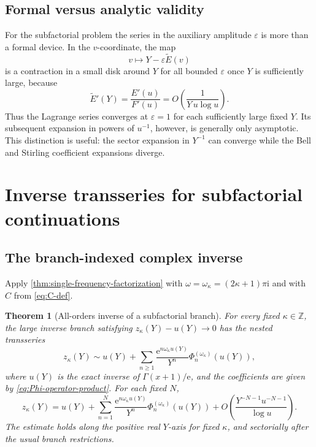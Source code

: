 \documentclass[11pt]{article}
\numberwithin{equation}{section}
\theoremstyle{mainthm}
\newtheorem{theorem}{Theorem}[section]
\theoremstyle{defstyle}
\theoremstyle{remark}
\newcommand{\e}{\mathrm e}
\newcommand{\ii}{\mathrm i}
\begin{document}
\subsection{Formal versus analytic validity}

For the subfactorial problem the series in the auxiliary amplitude \(\varepsilon\) is more than a formal device.  In the \(v\)-coordinate, the map
\[
 v\longmapsto Y-\varepsilon\widetilde E(v)
\]
is a contraction in a small disk around \(Y\) for all bounded \(\varepsilon\) once \(Y\) is sufficiently large, because
\begin{equation}\label{eq:Etilde-derivative}
 \widetilde E'(Y)=\frac{E'(u)}{F'(u)}
 =O\!\left(\frac{1}{Y\,u\log u}\right).
\end{equation}
Thus the Lagrange series converges at \(\varepsilon=1\) for each sufficiently large fixed \(Y\).  Its subsequent expansion in powers of \(u^{-1}\), however, is generally only asymptotic.  This distinction is useful: the sector expansion in \(Y^{-1}\) can converge while the Bell and Stirling coefficient expansions diverge.

\section{Inverse transseries for subfactorial continuations}\label{sec:subfactorial-main}

\subsection{The branch-indexed complex inverse}

Apply \cref{thm:single-frequency-factorization} with \(\omega=\omega_\kappa=(2\kappa+1)\pi\ii\) and with \(C\) from \cref{eq:C-def}.

\begin{theorem}[All-orders inverse of a subfactorial branch]\label{thm:subfactorial-branch-inverse}
For every fixed \(\kappa\in\mathbb Z\), the large inverse branch satisfying \(z_\kappa(Y)-u(Y)\to0\) has the nested transseries
\begin{equation}\label{eq:subfactorial-all-orders}
 \boxed{
 z_\kappa(Y)
 \sim u(Y)+\sum_{n\ge1}
 \frac{\e^{n\omega_\kappa u(Y)}}{Y^n}
 \Phi_n^{(\omega_\kappa)}(u(Y)),}
\end{equation}
where \(u(Y)\) is the exact inverse of \(\Gamma(x+1)/\e\), and the coefficients are given by \cref{eq:Phi-operator-product}.  For each fixed \(N\),
\begin{equation}\label{eq:subfactorial-sector-error}
 z_\kappa(Y)
 =u(Y)+\sum_{n=1}^{N}
 \frac{\e^{n\omega_\kappa u(Y)}}{Y^n}
 \Phi_n^{(\omega_\kappa)}(u(Y))
 +O\!\left(\frac{Y^{-N-1}u^{-N-1}}{\log u}\right).
\end{equation}
The estimate holds along the positive real \(Y\)-axis for fixed \(\kappa\), and sectorially after the usual branch restrictions.
\end{theorem}
\end{document}

